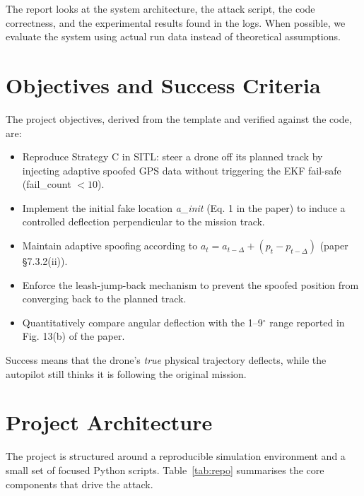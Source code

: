 \documentclass[12pt, a4paper]{article}
\begin{document}
The report looks at the system architecture, the attack script, the code correctness, and the experimental results found in the logs. When possible, we evaluate the system using actual run data instead of theoretical assumptions.

\section{Objectives and Success Criteria}

The project objectives, derived from the template and verified against the code, are:

\begin{itemize}[noitemsep]
  \item Reproduce Strategy C in SITL: steer a drone off its planned track by injecting adaptive spoofed GPS data without triggering the EKF fail-safe (fail\_count $< 10$).
  \item Implement the initial fake location \textit{a\_init} (Eq. 1 in the paper) to induce a controlled deflection perpendicular to the mission track.
  \item Maintain adaptive spoofing according to $a_t = a_{t-\Delta} + (p_t - p_{t-\Delta})$ (paper \S7.3.2(ii)).
  \item Enforce the leash-jump-back mechanism to prevent the spoofed position from converging back to the planned track.
  \item Quantitatively compare angular deflection with the 1--9$^\circ$ range reported in Fig. 13(b) of the paper.
\end{itemize}

Success means that the drone's \textit{true} physical trajectory deflects, while the autopilot still thinks it is following the original mission.

\section{Project Architecture}

The project is structured around a reproducible simulation environment and a small set of focused Python scripts. Table~\ref{tab:repo} summarises the core components that drive the attack.
\end{document}
